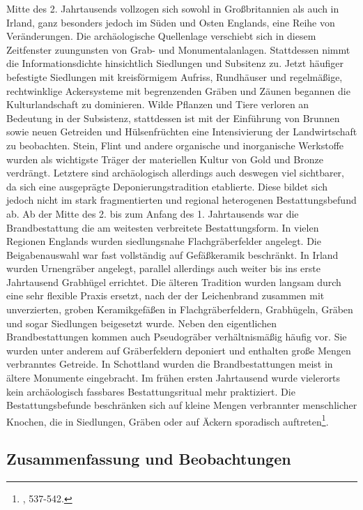 \documentclass[openany,twoside,twocolumn]{book}
\let\rmarkdownfootnote\footnote%
\def\footnote{\protect\rmarkdownfootnote}
\begin{document}
Mitte des 2. Jahrtausends vollzogen sich sowohl in Großbritannien als
auch in Irland, ganz besonders jedoch im Süden und Osten Englands, eine
Reihe von Veränderungen. Die archäologische Quellenlage verschiebt sich
in diesem Zeitfenster zuungunsten von Grab- und Monumentalanlagen.
Stattdessen nimmt die Informationsdichte hinsichtlich Siedlungen und
Subsitenz zu. Jetzt häufiger befestigte Siedlungen mit kreisförmigem
Aufriss, Rundhäuser und regelmäßige, rechtwinklige Ackersysteme mit
begrenzenden Gräben und Zäunen begannen die Kulturlandschaft zu
dominieren. Wilde Pflanzen und Tiere verloren an Bedeutung in der
Subsistenz, stattdessen ist mit der Einführung von Brunnen sowie neuen
Getreiden und Hülsenfrüchten eine Intensivierung der Landwirtschaft zu
beobachten. Stein, Flint und andere organische und inorganische
Werkstoffe wurden als wichtigste Träger der materiellen Kultur von Gold
und Bronze verdrängt. Letztere sind archäologisch allerdings auch
deswegen viel sichtbarer, da sich eine ausgeprägte Deponierungstradition
etablierte. Diese bildet sich jedoch nicht im stark fragmentierten und
regional heterogenen Bestattungsbefund ab. Ab der Mitte des 2. bis zum
Anfang des 1. Jahrtausends war die Brandbestattung die am weitesten
verbreitete Bestattungsform. In vielen Regionen Englands wurden
siedlungsnahe Flachgräberfelder angelegt. Die Beigabenauswahl war fast
vollständig auf Gefäßkeramik beschränkt. In Irland wurden Urnengräber
angelegt, parallel allerdings auch weiter bis ins erste Jahrtausend
Grabhügel errichtet. Die älteren Tradition wurden langsam durch eine
sehr flexible Praxis ersetzt, nach der der Leichenbrand zusammen mit
unverzierten, groben Keramikgefäßen in Flachgräberfeldern, Grabhügeln,
Gräben und sogar Siedlungen beigesetzt wurde. Neben den eigentlichen
Brandbestattungen kommen auch Pseudogräber verhältnismäßig häufig vor.
Sie wurden unter anderem auf Gräberfeldern deponiert und enthalten große
Mengen verbranntes Getreide. In Schottland wurden die Brandbestattungen
meist in ältere Monumente eingebracht. Im frühen ersten Jahrtausend
wurde vielerorts kein archäologisch fassbares Bestattungsritual mehr
praktiziert. Die Bestattungsbefunde beschränken sich auf kleine Mengen
verbrannter menschlicher Knochen, die in Siedlungen, Gräben oder auf
Äckern sporadisch auftreten\footnote{\textcite{roberts_britain_2013},
  537-542.}.

\hypertarget{zusammenfassung-und-beobachtungen}{%
\subsection{Zusammenfassung und
Beobachtungen}\label{zusammenfassung-und-beobachtungen}}
\end{document}
